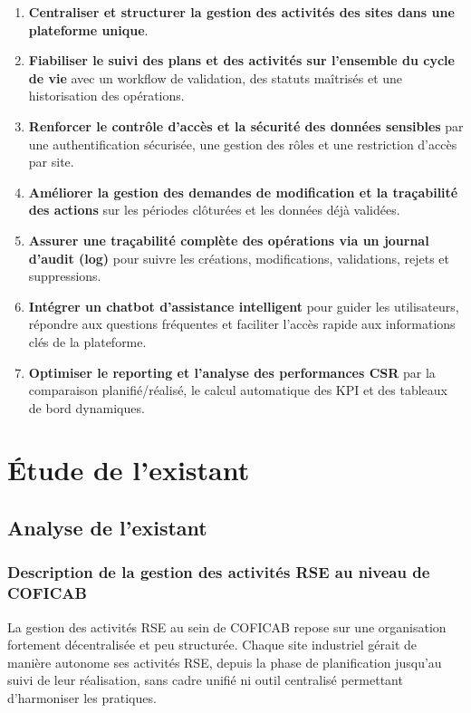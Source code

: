 \begin{enumerate}
  \item \textbf{Centraliser et structurer la gestion des activités des sites dans une plateforme unique}.
  \item \textbf{Fiabiliser le suivi des plans et des activités sur l’ensemble du cycle de vie} avec un workflow de validation, des statuts maîtrisés et une historisation des opérations.
  \item \textbf{Renforcer le contrôle d’accès et la sécurité des données sensibles} par une authentification sécurisée, une gestion des rôles et une restriction d’accès par site.
  \item \textbf{Améliorer la gestion des demandes de modification et la traçabilité des actions} sur les périodes clôturées et les données déjà validées.
  \item \textbf{Assurer une traçabilité complète des opérations via un journal d’audit (log)} pour suivre les créations, modifications, validations, rejets et suppressions.
  \item \textbf{Intégrer un chatbot d’assistance intelligent} pour guider les utilisateurs, répondre aux questions fréquentes et faciliter l’accès rapide aux informations clés de la plateforme.
  \item \textbf{Optimiser le reporting et l’analyse des performances CSR} par la comparaison planifié/réalisé, le calcul automatique des KPI et des tableaux de bord dynamiques.
\end{enumerate}

\section{Étude de l’existant}

\subsection{Analyse de l’existant}

\subsubsection{Description de la gestion des activités RSE au niveau de COFICAB}

La gestion des activités RSE au sein de COFICAB repose sur une organisation fortement décentralisée et peu structurée. Chaque site industriel gérait de manière autonome ses activités RSE, depuis la phase de planification jusqu’au suivi de leur réalisation, sans cadre unifié ni outil centralisé permettant d’harmoniser les pratiques.

